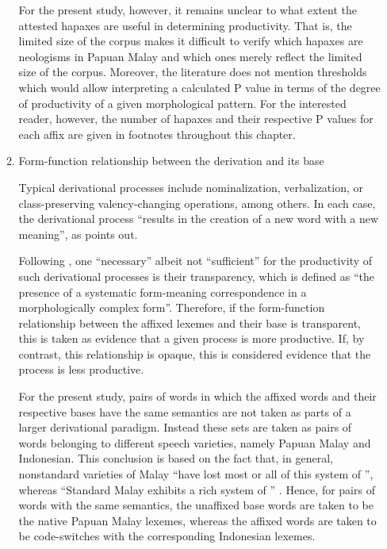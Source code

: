 \begin{enumerate}
\begin{enumerate}
For the present study, however, it remains unclear to what extent the attested hapaxes are useful in determining productivity. That is, the limited size of the corpus makes it difficult to verify which hapaxes are neologisms in Papuan Malay and which ones merely reflect the limited size of the corpus. Moreover, the literature does not mention thresholds which would allow interpreting a calculated P value in terms of the degree of productivity of a given morphological pattern. For the interested reader, however, the number of hapaxes and their respective P values for each affix are given in footnotes throughout this chapter.



\item 
Form-function relationship between the derivation and its base\label{List_3.1.c}


Typical derivational processes include nominalization, verbalization, or class-preserving valency-changing operations, among others. In each case, the derivational process “results in the creation of a new word with a new meaning”, as {\citet[35]{Aikhenvald.2007}} points out.



Following \citet[240, 323]{Booij.2007}, one “necessary” albeit not “sufficient”  for the productivity of such derivational processes is their transparency, which is defined as “the presence of a systematic form-meaning correspondence in a morphologically complex form”. Therefore, if the form-function relationship between the affixed lexemes and their base is transparent, this is taken as evidence that a given  process is more productive. If, by contrast, this relationship is opaque, this is considered evidence that the process is less productive.



For the present study, pairs of words in which the affixed words and their respective bases have the same semantics are not taken as parts of a larger derivational paradigm. Instead these sets are taken as pairs of words belonging to different speech varieties, namely Papuan Malay and Indonesian. This conclusion is based on the fact that, in general, nonstandard varieties of Malay “have lost most or all of this system of ”, whereas “Standard Malay exhibits a rich system of ” \citep[20]{Paauw.2009}. Hence, for pairs of words with the same semantics, the unaffixed base words are taken to be the native Papuan Malay lexemes, whereas the affixed words are taken to be code-switches with the corresponding Indonesian lexemes.



\end{enumerate}
\end{enumerate}
